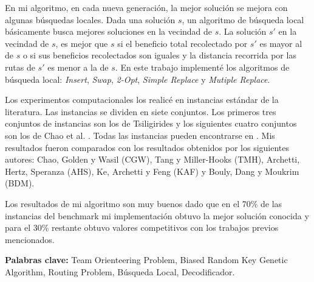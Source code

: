 \bigskip

En mi algoritmo, en cada nueva generación, la mejor solución se mejora con algunas búsquedas locales. Dada una solución $s$, un algoritmo de búsqueda local básicamente busca mejores soluciones en la vecindad de $s$. La solución $s'$ en la vecindad de $s$, es mejor que $s$ si el beneficio total recolectado por $s'$ es mayor al de $s$ o si sus beneficios recolectados son iguales y la distancia recorrida por las rutas de $s'$ es menor a la de $s$. En este trabajo implementé los algoritmos de búsqueda local: \textit{Insert}, \textit{Swap}, \textit{2-Opt}, \textit{Simple Replace} y \textit{Mutiple Replace}.

\bigskip

Los experimentos computacionales los realicé en instancias estándar de la literatura. Las instancias se dividen en siete conjuntos. Los primeros tres conjuntos de instancias son los de Tsiligirides \cite{Tsiligirides} y los siguientes cuatro conjuntos son los de Chao et al. \cite{ChaoGoldenWasil}. Todas las instancias pueden encontrarse en \cite{IntancesChaoTsiligirides}. Mis resultados fueron comparados con los resultados obtenidos por los siguientes autores: Chao, Golden y Wasil \cite{ChaoGoldenWasil} (CGW), Tang y Miller-Hooks \cite{TangMillerHooks} (TMH), Archetti, Hertz, Speranza \cite{ArchettiHertzSperanza} (AHS), Ke, Archetti y Feng \cite{KeArchettiFeng} (KAF) y Bouly, Dang y Moukrim \cite{BoulyDangMoukrim} (BDM). 

\bigskip

Los resultados de mi algoritmo son muy buenos dado que en el 70\% de las instancias del benchmark mi implementación obtuvo la mejor solución conocida y para el 30\% restante obtuvo valores competitivos con los trabajos previos mencionados.

\bigskip

\noindent\textbf{Palabras clave:} Team Orienteering Problem, Biased Random Key Genetic Algorithm, Routing Problem, Búsqueda Local, Decodificador.